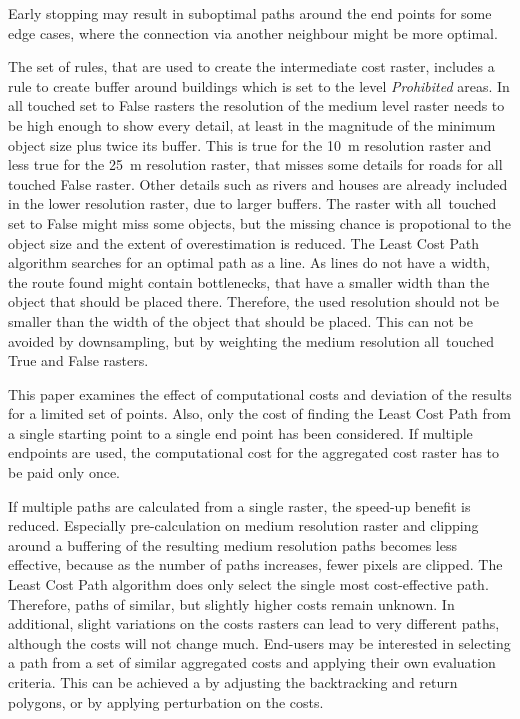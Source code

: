 Early stopping may result in suboptimal paths around the end points for some edge cases, where the connection via another neighbour might be more optimal.

The set of rules, that are used to create the intermediate cost raster, includes a rule to create buffer around buildings which is set to the level \textit{Prohibited} areas.
In all touched set to False rasters the resolution of the medium level raster needs to be high enough to show every detail,
at least in the magnitude of the minimum object size plus twice its buffer.
This is true for the 10~m resolution raster and less true for the 25~m resolution raster, that misses some details for roads for all touched False raster.
Other details such as rivers and houses are already included in the lower resolution raster, due to larger buffers.
The raster with all~touched set to False might miss some objects, but the missing chance is propotional to the object size and the extent of overestimation is reduced.
The Least Cost Path algorithm searches for an optimal path as a line.
As lines do not have a width, the route found might contain bottlenecks, that have a smaller width than the object that should be placed there.
Therefore, the used resolution should not be smaller than the width of the object that should be placed.
This can not be avoided by downsampling, but by weighting the medium resolution all~touched True and False rasters.


This paper examines the effect of computational costs and deviation of the results for a limited set of points.
Also, only the cost of finding the Least Cost Path from a single starting point to a single end point has been considered.
If multiple endpoints are used, the computational cost for the aggregated cost raster has to be paid only once.

If multiple paths are calculated from a single raster, the speed-up benefit is reduced.
Especially pre-calculation on medium resolution raster and clipping around a buffering of the resulting medium resolution paths becomes less effective, because as the number of paths increases, fewer pixels are clipped.
The Least Cost Path algorithm does only select the single most cost-effective path.
Therefore, paths of similar, but slightly higher costs remain unknown.
In additional, slight variations on the costs rasters can lead to very different paths, although the costs will not change much.
End-users may be interested in selecting a path from a set of similar aggregated costs and applying their own evaluation criteria.
This can be achieved a by adjusting the backtracking and return polygons, or by applying perturbation on the costs.

